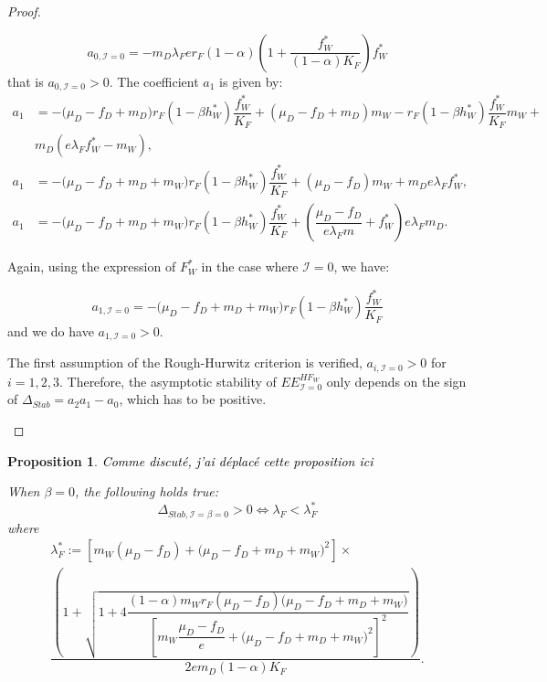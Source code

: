 \documentclass{article}
\newcommand{\lfw}{\lambda_{F}}
\newcommand{\lfw}{\lambda_{F}}
\newcommand{\cI}{\mathcal{I}}
\newcommand{\vdeux}[1]{\textcolor{black}{#1}}
\newtheorem{prop}[theorem]{Proposition}
\theoremstyle{definition}
\theoremstyle{remark}
\begin{document}
\begin{proof}
\begin{itemize}
\begin{equation*}
a_{0, \cI=0} = -m_D \lfw e r_F  (1- \alpha) \left(1 + \dfrac{f_W^*}{(1 - \alpha)K_F}\right) f_W^* 
\end{equation*}
that is $a_{0, \cI=0}>0$. The coefficient $a_1$ is given by:
\begin{subequations}
\begin{align}
a_1 &= - \big( \mu_D  -f_D + m_D) r_F(1 - \beta h_W^*) \dfrac{f^*_W}{K_F} + (\mu_D -f_D + m_D) m_W - r_F(1 - \beta h_W^*) \dfrac{f_W^*}{K_F} m_W + \\ \nonumber &m_D (e\lfw f^*_W - m_W), \\
a_1 &= - \big( \mu_D-f_D + m_D + m_W) r_F(1 - \beta h_W^*) \dfrac{f^*_W}{K_F} + (\mu_D -f_D) m_W  + m_D e\lfw f^*_W, \\
a_1 &= -\big( \mu_D  -f_D + m_D + m_W) r_F(1 - \beta h_W^*) \dfrac{f^*_W}{K_F} + \left(\dfrac{\mu_D -f_D}{e\lfw m} + f_W^*\right) e \lfw m_D . \label{equation:coefficient a1}
\end{align}
\end{subequations}

Again, using the expression of $F^*_W$ in the case where $\cI = 0$, we have:

\begin{equation*}
a_{1, \cI =0} = -\big( \mu_D  -f_D + m_D + m_W) r_F(1 - \beta h_W^*) \dfrac{f^*_W}{K_F}
\end{equation*}
and we do have $a_{1, \cI =0} > 0$.

The first assumption of the Rough-Hurwitz criterion is verified, $a_{i, \cI =0} > 0$ for $i=1,2,3$. Therefore, the asymptotic stability of $EE^{HF_W}_{\cI =0}$ only depends on the sign of $\Delta_{Stab}= a_2 a_1 - a_0$, which has to be positive. 
\end{itemize}
\end{proof}


\begin{prop} \label{prop:stab, cI=beta=0}
\vdeux{Comme discuté, j'ai déplacé cette proposition ici}

When $\beta = 0$, the following holds true:
$$ \Delta_{Stab, \cI = \beta = 0} > 0 \Leftrightarrow \lfw < \lfw^*$$
where 
\begin{multline*}
\lfw^* := \left[m_{W}(\mu_{D}-f_{D})+\big(\mu_{D}-f_{D}+m_{D}+m_{W})^{2}\right] \times \\
 \dfrac{\left(1+\sqrt{1+4\dfrac{(1-\alpha)m_{W}r_{F}\left(\mu_{D}-f_{D}\right)\big(\mu_{D}-f_{D}+m_{D}+m_{W})}{\left[m_{W}\dfrac{\mu_{D}-f_{D}}{e}+\big(\mu_{D}-f_{D}+m_{D}+m_{W})^{2}\right]^{2}}}\right)}{2em_D (1-\alpha) K_F }.
\end{multline*}
\end{prop}
\end{document}

